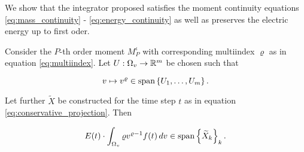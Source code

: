 We show that the integrator proposed satisfies the moment continuity equations 
\ref{eq:mass_continuity} - \ref{eq:energy_continuity} as well as preserves the 
electric energy up to first oder. 

\iffalse
\begin{lemma}\label{lem:conservation}
    Consider the $P$-th order moment $M_P^\iota$ with corresponding 
    multiindex $\varrho$ as in equation \ref{eq:multiindex}.
    Let $U : \Omega_v \to \mathbb{R}^m$ be chosen such that 

    \begin{equation}
        v \mapsto v^\varrho \in \text{span} \left\{ U_1, \ldots, U_m \right\} . 
    \end{equation}
 
    Let further $\widetilde{ X }$ be constructed for the time step $t$ as in equation 
    \ref{eq:conservative_projection}.  Then 

    \begin{equation}
        E(t) \cdot \int_{\Omega_v} \varrho v^{\varrho - 1} f(t) \,dv 
        \in \text{span} \left\{ \widetilde{ X }_k \right\}_k . 
    \end{equation}
\end{lemma}

